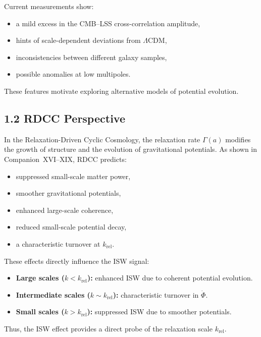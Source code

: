 \documentclass[11pt,a4paper]{article}
\begin{document}
Current measurements show:

\begin{itemize}
    \item a mild excess in the CMB–LSS cross-correlation amplitude,
    \item hints of scale-dependent deviations from $\Lambda$CDM,
    \item inconsistencies between different galaxy samples,
    \item possible anomalies at low multipoles.
\end{itemize}

These features motivate exploring alternative models of potential evolution.

\subsection*{1.2 RDCC Perspective}

In the Relaxation-Driven Cyclic Cosmology, the relaxation rate $\Gamma(a)$ modifies the 
growth of structure and the evolution of gravitational potentials. As shown in 
Companion~XVI–XIX, RDCC predicts:

\begin{itemize}
    \item suppressed small-scale matter power,
    \item smoother gravitational potentials,
    \item enhanced large-scale coherence,
    \item reduced small-scale potential decay,
    \item a characteristic turnover at $k_{\mathrm{rel}}$.
\end{itemize}

These effects directly influence the ISW signal:

\begin{itemize}
    \item \textbf{Large scales ($k < k_{\mathrm{rel}}$):}
    enhanced ISW due to coherent potential evolution.
    \item \textbf{Intermediate scales ($k \sim k_{\mathrm{rel}}$):}
    characteristic turnover in $\dot{\Phi}$.
    \item \textbf{Small scales ($k > k_{\mathrm{rel}}$):}
    suppressed ISW due to smoother potentials.
\end{itemize}

Thus, the ISW effect provides a direct probe of the relaxation scale $k_{\mathrm{rel}}$.
\end{document}

